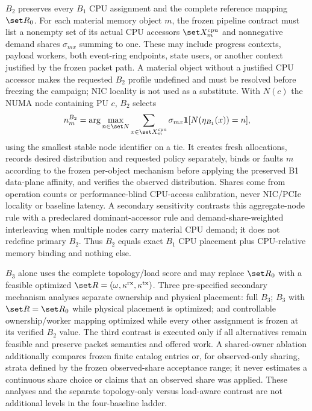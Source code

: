 $B_2$ preserves every $B_1$ CPU assignment and the complete reference mapping $\set R_0$. For each material memory object $m$, the frozen pipeline contract must list a nonempty set of its actual CPU accessors $\set X_m^{\mathrm{cpu}}$ and nonnegative demand shares $\sigma_{mx}$ summing to one. These may include progress contexts, payload workers, both event-ring endpoints, state users, or another context justified by the frozen packet path. A material object without a justified CPU accessor makes the requested $B_2$ profile undefined and must be resolved before freezing the campaign; NIC locality is not used as a substitute. With $N(c)$ the NUMA node containing PU $c$, $B_2$ selects
\begin{equation}
 n_m^{B_2}=\arg\max_{n\in\set N}
 \sum_{x\in\set X_m^{\mathrm{cpu}}}\sigma_{mx}
 \mathbf{1}[N(\eta_{B_1}(x))=n],
 \label{eq:b2-memory-rule}
\end{equation}
using the smallest stable node identifier on a tie. It creates fresh allocations, records desired distribution and requested policy separately, binds or faults $m$ according to the frozen per-object mechanism before applying the preserved B1 data-plane affinity, and verifies the observed distribution. Shares come from operation counts or performance-blind CPU-access calibration, never NIC/PCIe locality or baseline latency. A secondary sensitivity contrasts this aggregate-node rule with a predeclared dominant-accessor rule and demand-share-weighted interleaving when multiple nodes carry material CPU demand; it does not redefine primary $B_2$. Thus $B_2$ equals exact $B_1$ CPU placement plus CPU-relative memory binding and nothing else.

$B_3$ alone uses the complete topology/load score and may replace $\set R_0$ with a feasible optimized $\set R=(\omega,\kappa^{\mathrm{rx}},\kappa^{\mathrm{tx}})$. Three pre-specified secondary mechanism analyses separate ownership and physical placement: full $B_3$; $B_3$ with $\set R=\set R_0$ while physical placement is optimized; and controllable ownership/worker mapping optimized while every other assignment is frozen at its verified $B_2$ value. The third contrast is executed only if all alternatives remain feasible and preserve packet semantics and offered work. A shared-owner ablation additionally compares frozen finite catalog entries or, for observed-only sharing, strata defined by the frozen observed-share acceptance range; it never estimates a continuous share choice or claims that an observed share was applied. These analyses and the separate topology-only versus load-aware contrast are not additional levels in the four-baseline ladder.

